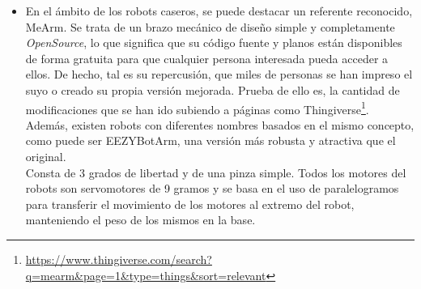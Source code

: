 \begin{itemize}
    \newpage
    \item En el ámbito de los robots caseros, se puede destacar un referente reconocido, MeArm. Se trata de un 
    brazo mecánico de diseño simple y completamente \textit{OpenSource}, lo que significa que su código fuente y planos están disponibles 
    de forma gratuita para que cualquier persona interesada pueda acceder a ellos. De hecho, tal es su repercusión, que miles de personas 
    se han impreso el suyo o creado su propia versión mejorada. Prueba de ello es, la cantidad de modificaciones que se han ido subiendo a  
    páginas como Thingiverse\footnote{\url{https://www.thingiverse.com/search?q=mearm&page=1&type=things&sort=relevant}}. Además, existen 
    robots con diferentes nombres basados en el mismo concepto, como puede ser EEZYBotArm, una versión más robusta y atractiva que el original. \\
    Consta de 3 grados de libertad y de una pinza simple. Todos los motores del robots son servomotores de 9 gramos y se basa en el uso de 
    paralelogramos para transferir el movimiento de los motores al extremo del robot, manteniendo el peso de los mismos en la base. 


\end{itemize}
